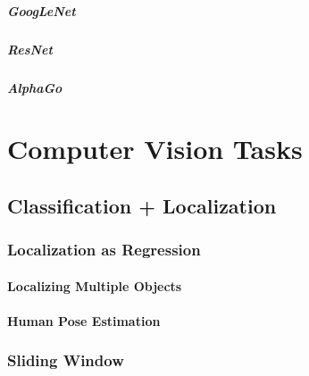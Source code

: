 			\paragraph{GoogLeNet} %

			\paragraph{ResNet} %

			\paragraph{AlphaGo} %

\chapter{Computer Vision Tasks} %

	\section{Classification + Localization} %

		\subsection{Localization as Regression} %

			\subsubsection{Localizing Multiple Objects} %

			\subsubsection{Human Pose Estimation} %

		\subsection{Sliding Window} %

